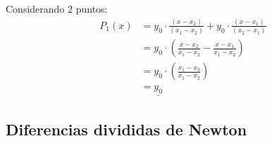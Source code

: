 Considerando 2 puntos:\\
\begin{align*}
P_{1}(x) &= y_{0} \cdot \frac{(x - x_{2})}{(x_{1} - x_{2})} + y_{0} \cdot \frac{(x - x_{1})}{(x_{2} - x_{1})} \\
&= y_{0} \cdot \left( \frac{x - x_{2}}{x_{1} - x_{2}} - \frac{x - x_{1}}{x_{1} - x_{2}} \right) \\
&= y_{0} \cdot \left(  \frac{x_{1} - x_{2}}{x_{1} - x_{2}}  \right) \\
&= \underline{y_{0}}
\end{align*}








\newpage

\subsection{Diferencias divididas de Newton} 

